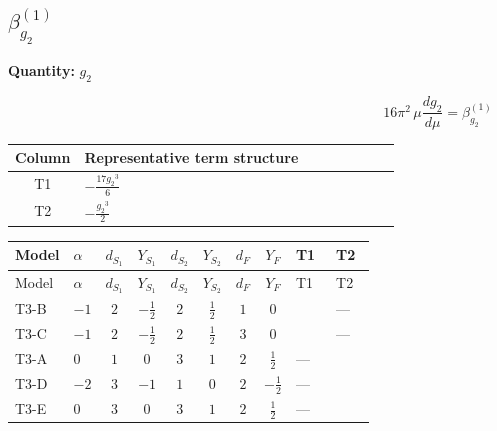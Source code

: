 \documentclass[8pt]{article}
\begin{document}
\begin{landscape}
\section*{$\beta_{g_2}^{(1)}$}
\noindent\textbf{Quantity: }$g_2$\par\smallskip
\[16\pi^2\,\mu\frac{d g_2}{d\mu}=\beta_{g_2}^{(1)}\]
\begin{center}
\begin{tabular}{@{}c >{\raggedright\arraybackslash}p{0.82\linewidth}@{}}
\toprule
Column & Representative term structure \\
\midrule
T1 & \(\displaystyle -\frac{17 {g_2}^3}{6}\) \\
\midrule
T2 & \(\displaystyle -\frac{{g_2}^3}{2}\) \\
\midrule
\bottomrule
\end{tabular}
\end{center}
\smallskip
\tiny
\begin{longtable}{@{}llcccccc >{\raggedright\arraybackslash}p{0.21\linewidth} >{\raggedright\arraybackslash}p{0.21\linewidth}@{}}
\toprule
Model & $\alpha$ & $d_{S_1}$ & $Y_{S_1}$ & $d_{S_2}$ & $Y_{S_2}$ & $d_F$ & $Y_F$ & T1 & T2 \\
\midrule
\endfirsthead
\toprule
Model & $\alpha$ & $d_{S_1}$ & $Y_{S_1}$ & $d_{S_2}$ & $Y_{S_2}$ & $d_F$ & $Y_F$ & T1 & T2 \\
\midrule
\endhead
T3-B & $-1$ & $2$ & $-\frac{1}{2}$ & $2$ & $\frac{1}{2}$ & $1$ & $0$ & \scriptsize\adjustbox{max width=\linewidth}{$\begin{gathered} -\frac{17 {g_2}^3}{6}\end{gathered}$} & --- \\
\midrule
T3-C & $-1$ & $2$ & $-\frac{1}{2}$ & $2$ & $\frac{1}{2}$ & $3$ & $0$ & \scriptsize\adjustbox{max width=\linewidth}{$\begin{gathered} \frac{7 {g_2}^3}{6}\end{gathered}$} & --- \\
\midrule
T3-A & $0$ & $1$ & $0$ & $3$ & $1$ & $2$ & $\frac{1}{2}$ & --- & \scriptsize\adjustbox{max width=\linewidth}{$\begin{gathered} -\frac{{g_2}^3}{2}\end{gathered}$} \\
\midrule
T3-D & $-2$ & $3$ & $-1$ & $1$ & $0$ & $2$ & $-\frac{1}{2}$ & --- & \scriptsize\adjustbox{max width=\linewidth}{$\begin{gathered} -\frac{{g_2}^3}{2}\end{gathered}$} \\
\midrule
T3-E & $0$ & $3$ & $0$ & $3$ & $1$ & $2$ & $\frac{1}{2}$ & --- & \scriptsize\adjustbox{max width=\linewidth}{$\begin{gathered} \frac{{g_2}^3}{6}\end{gathered}$} \\
\midrule
\bottomrule
\end{longtable}
\clearpage

\end{landscape}
\end{document}
